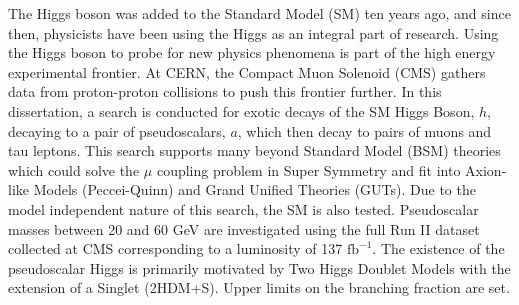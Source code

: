 The Higgs boson was added to the Standard Model (SM) ten years ago, and since then, physicists have been using the Higgs as an integral part of research.  
Using the Higgs boson to probe for new physics phenomena is part of the high energy experimental frontier. 
At CERN, the Compact Muon Solenoid (CMS) gathers data from proton-proton collisions to push this frontier further. 
In this dissertation, a search is conducted for exotic decays of the SM Higgs Boson, $h$, decaying to a pair of pseudoscalars, $a$, which then decay to pairs of muons and tau leptons. 
This search supports many beyond Standard Model (BSM) theories which could solve the $\mu$ coupling problem in Super Symmetry and fit into Axion-like Models (Peccei-Quinn) and Grand Unified Theories (GUTs). 
Due to the model independent nature of this search, the SM is also tested. 
Pseudoscalar masses between 20 and 60 GeV are investigated using the full Run II dataset collected at CMS corresponding to a luminosity of 137 $\text{fb}^{-1}$. The existence of the pseudoscalar Higgs is primarily motivated by Two Higgs Doublet Models with the extension of a Singlet (2HDM+S). Upper limits on the branching fraction are set.

